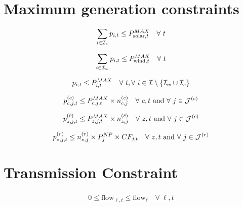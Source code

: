 \documentclass[11pt, oneside]{article}   	%
\newcommand{\flow}{\text{flow}}
\newcommand{\bc}{\bar{c}}
\begin{document}
\section{Maximum generation constraints}

\begin{equation} \label{eq:ex_solar}
\begin{split}
\sum_{i \in \mathcal{I}_s} p_{i, t} \le P^{MAX}_{\text{solar}, t} \quad \forall~t
\end{split}
\end{equation}

\begin{equation} \label{eq:ex_wind}
\begin{split}
\sum_{i \in \mathcal{I}_w} p_{i, t} \le P^{MAX}_{\text{wind}, t} \quad \forall~t
\end{split}
\end{equation}

\begin{equation} \label{eq:ex_therm}
\begin{split}
p_{i, t} \le P^{MAX}_{i, t} \quad \forall~t, \forall~i \in \mathcal{I} \setminus \{\mathcal{I}_w \cup \mathcal{I}_s \}
\end{split}
\end{equation}

\begin{equation} \label{eq:new_therm}
\begin{split}
p^{(c)}_{c, j, t} \le P^{MAX}_{c, j, t} \times n^{(c)}_{c, j} \quad \forall~c, t  \text{ and }\forall~j\in \mathcal{J}^{(c)}
\end{split}
\end{equation}

\begin{equation} \label{eq:new_therm2}
\begin{split}
p^{(\bc)}_{z, j, t} \le P^{MAX}_{z, j, t} \times n^{(\bc)}_{z, j} \quad \forall~z, t  \text{ and }\forall~j\in \Jc^{(\bc)}
\end{split}
\end{equation}

\begin{equation} \label{eq:new_ren}
\begin{split}
p^{(r)}_{z, j, t} \le n^{(r)}_{z, j}\times P^{NP}_{j} \times CF_{j, t}  \quad \forall~z, t  \text{ and }\forall~j\in \mathcal{J}^{(r)}
\end{split}
\end{equation}

\section{Transmission Constraint}

\begin{equation} \label{eq:trans}
\begin{split}
0 \le \flow_{\ell, t} \le   \overline{\flow}_{\ell} \quad \forall~\ell, t
\end{split}
\end{equation}
\end{document}
